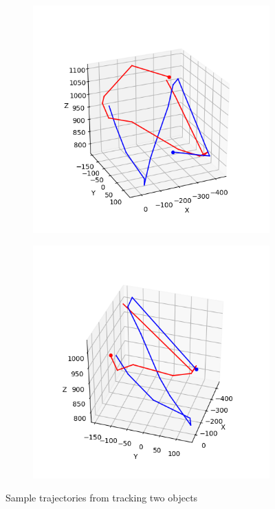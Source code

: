 \begin{figure}
\centering
\begin{subfigure}{0.48\linewidth}
	\includegraphics[width=\linewidth]{img/experiments/trajectories1.png}
\end{subfigure}
\begin{subfigure}{0.48\linewidth}
	\includegraphics[width=\linewidth]{img/experiments/trajectories2.png}
\end{subfigure}
\caption{Sample trajectories from tracking two objects}
\label{fig:two-trajectories}
\end{figure}
